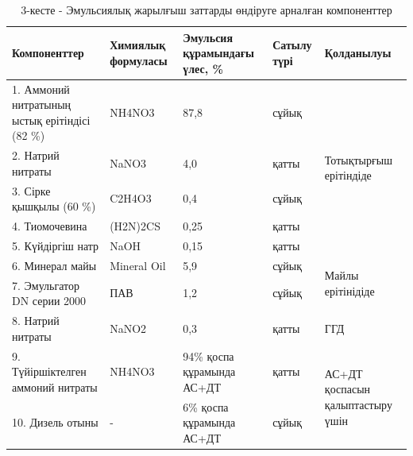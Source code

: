 \begin{table}[H]
\caption*{3-кесте - Эмульсиялық жарылғыш заттарды өндіруге арналған компоненттер}
\centering
\begin{tabular}{|p{}|p{}|p{}|l|p{}|}
\hline
Компоненттер & Химиялық формуласы & Эмульсия құрамындағы үлес, \% & Сатылу түрі & Қолданылуы \\ \hline
1. Аммоний нитратының ыстық ерітіндісі (82 \%) & NH4NO3 & 87,8 & сұйық & \multirow{5}{=}{Тотықтырғыш ерітіндіде} \\ \cline{1-4}
2. Натрий нитраты & NaNO3 & 4,0 & қатты & \\ \cline{1-4}
3. Сірке қышқылы (60 \%) & C2H4O3 & 0,4 & сұйық & \\ \cline{1-4}
4. Тиомочевина & (H2N)2CS & 0,25 & қатты & \\ \cline{1-4}
5. Күйдіргіш натр & NaOH & 0,15 & қатты & \\ \hline
6. Минерал майы & Mineral Oil & 5,9 & сұйық & \multirow{2}{=}{Майлы ерітінідіде} \\ \cline{1-4}
7. Эмульгатор DN серии 2000 & ПАВ & 1,2 & сұйық & \\ \hline
8. Натрий нитраты & NaNO2 & 0,3 & қатты & ГГД \\ \hline
9. Түйіршіктелген аммоний нитраты & NH4NO3 & 94\% қоспа құрамында АС+ДТ & қатты & \multirow{2}{=}{АС+ДТ қоспасын қалыптастыру үшін} \\ \cline{1-4}
10. Дизель отыны & - & 6\% қоспа құрамында АС+ДТ & сұйық & \\ \hline
\end{tabular}
\end{table}

